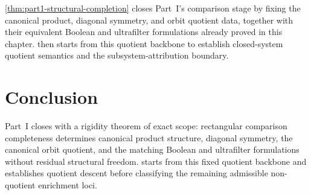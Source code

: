 \begin{remark}
	\cref{thm:part1-structural-completion} closes Part~I's comparison
	stage by fixing the canonical product, diagonal symmetry, and orbit
	quotient data, together with their equivalent Boolean and ultrafilter
	formulations already proved in this chapter.
	 then starts from this quotient backbone to
	establish closed-system quotient semantics and the
	subsystem-attribution boundary.
\end{remark}

\section{Conclusion}
\label{sec:bottom-transition}
Part~I closes with a rigidity theorem of exact scope: rectangular
comparison completeness determines canonical product structure, diagonal
symmetry, the canonical orbit quotient, and the matching Boolean and
ultrafilter formulations without residual structural freedom.
 starts from this fixed quotient backbone and
establishes quotient descent before classifying the remaining
admissible non-quotient enrichment loci.

\begin{chapterclosing}
\end{chapterclosing}

